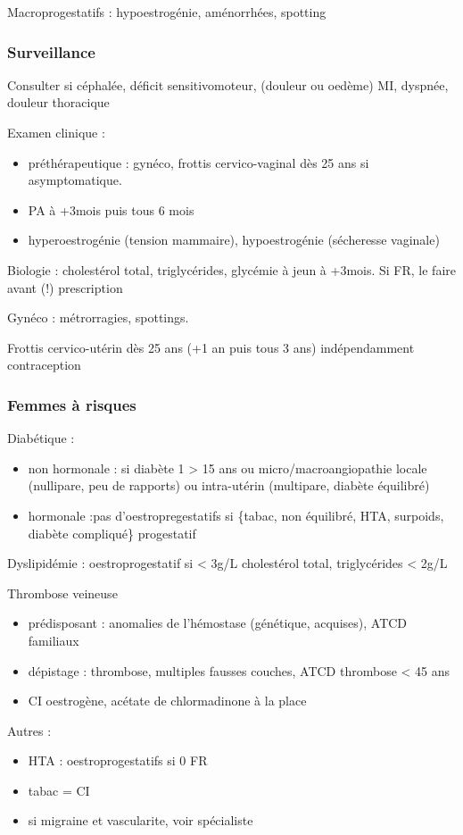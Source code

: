 \documentclass[11pt]{article}
\begin{document}
Macroprogestatifs : hypoestrogénie, aménorrhées, spotting

\subsubsection{Surveillance}
\label{sec:org9a0e24e}
Consulter si céphalée, déficit sensitivomoteur, (douleur ou oedème) MI, dyspnée,
douleur thoracique

Examen clinique : 
\begin{itemize}
\item préthérapeutique : gynéco, frottis cervico-vaginal dès 25 ans si
asymptomatique.
\item PA à +3mois puis tous 6 mois
\item hyperoestrogénie (tension mammaire), hypoestrogénie (sécheresse vaginale)
\end{itemize}
Biologie : cholestérol total, triglycérides, glycémie à jeun à +3mois. Si FR, le
faire avant (!) prescription

Gynéco : métrorragies, spottings. 

Frottis cervico-utérin dès 25 ans (+1 an puis tous 3 ans) indépendamment contraception

\subsubsection{Femmes à risques}
\label{sec:orga6d3929}
Diabétique :
\begin{itemize}
\item non hormonale : si diabète 1 > 15 ans ou micro/macroangiopathie \thus locale
(nullipare, peu de rapports) ou intra-utérin (multipare, diabète équilibré)
\item hormonale :pas d'oestropregestatifs si \{tabac, non équilibré, HTA, surpoids,
diabète compliqué\} \thus progestatif
\end{itemize}
Dyslipidémie : oestroprogestatif si < 3g/L cholestérol total, triglycérides <
2g/L

Thrombose veineuse
\begin{itemize}
\item prédisposant : anomalies de l'hémostase (génétique, acquises), ATCD familiaux
\item dépistage : thrombose, multiples fausses couches, ATCD thrombose < 45 ans
\item CI oestrogène, acétate de chlormadinone à la place
\end{itemize}

Autres :
\begin{itemize}
\item HTA : oestroprogestatifs si 0 FR
\item tabac = CI
\item si migraine et vascularite, voir spécialiste
\end{itemize}
\end{document}
